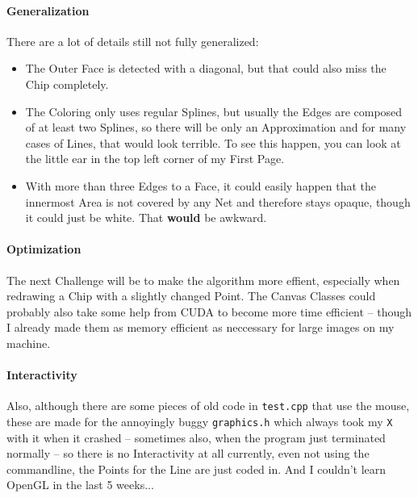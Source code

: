 \documentclass[10pt]{article}
\newcommand\behindIncludes{1}
\begin{document}
\paragraph{Generalization}
	There are a lot of details still not fully generalized:
	\begin{itemize}
		\item The Outer Face is detected with a diagonal, but that could also miss the Chip completely.
		\item The Coloring only uses regular Splines, but usually the Edges are composed of at least two Splines, so there will be only an Approximation and for many cases of Lines, that would look terrible. To see this happen, you can look at the little ear in the top left corner of my First Page.
		\item With more than three Edges to a Face, it could easily happen that the innermost Area is not covered by any Net and therefore stays opaque, though it could just be white. That {\bf would} be awkward.
	\end{itemize}
\paragraph{Optimization}
	The next Challenge will be to make the algorithm more effient, especially when redrawing a Chip with a slightly changed Point.
	The Canvas Classes could probably also take some help from CUDA to become more time efficient – though I already made them as memory efficient as neccessary for large images on my machine. \newline
\paragraph{Interactivity}
	Also, although there are some pieces of old code in {\tt test.cpp} that use the mouse, these are made for the annoyingly buggy {\tt graphics.h} which always took my {\tt X} with it when it crashed – sometimes also, when the program just terminated normally – so there is no Interactivity at all currently, even not using the commandline, the Points for the Line are just coded in. And I couldn't learn OpenGL in the last 5 weeks...
\end{document}
